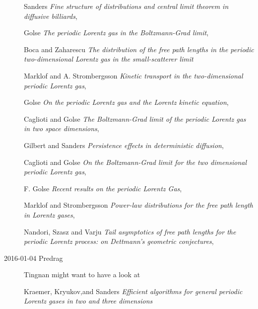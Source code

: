 \begin{description}
Sanders
{\em Fine structure of distributions and central limit theorem in diffusive billiards},

Golse
{\em The periodic Lorentz gas in the {Boltzmann-Grad} limit},

Boca and Zaharescu {\em The distribution of the free path lengths in the periodic two-dimensional Lorentz gas in the small-scatterer limit}

Marklof and A. Strombergsson {\em Kinetic transport in the two-dimensional periodic Lorentz gas},

Golse {\em On the periodic Lorentz gas and the Lorentz kinetic equation},

Caglioti and Golse {\em The {Boltzmann-Grad} limit of the periodic Lorentz gas in two space dimensions},

Gilbert and Sanders {\em Persistence effects in deterministic diffusion},

Caglioti and Golse {\em On the {Boltzmann-Grad} limit for the two dimensional periodic Lorentz gas},

F. Golse {\em Recent results on the periodic Lorentz Gas},

Marklof and Strombergsson
{\em Power-law distributions for the free path length in Lorentz gases},

Nandori, Szasz and Varju
{\em Tail asymptotics of free path lengths for the periodic Lorentz process: on Dettmann's geometric conjectures},


\item[2016-01-04 Predrag]
Tingnan might want to have a look at

Kraemer, Kryukov,and Sanders
{\em Efficient algorithms for general periodic {Lorentz} gases in two and three dimensions}



\end{description}
